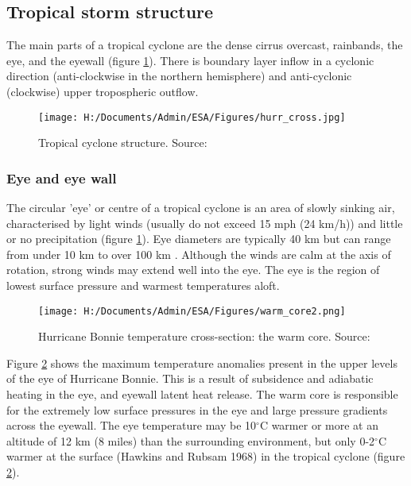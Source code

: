 

\subsection{Tropical storm structure}

The main parts of a tropical cyclone are the dense cirrus overcast, rainbands, the eye, and the eyewall (figure \ref{fig:cyclone_structure}). There is boundary layer inflow in a cyclonic direction (anti-clockwise in the northern hemisphere) and anti-cyclonic (clockwise) upper tropospheric outflow.


\begin{figure}[h]
	\centering
	\noindent\texttt{[image: H:/Documents/Admin/ESA/Figures/hurr\_cross.jpg]}
	\caption{Tropical cyclone structure. Source: \cite{noaa_structure}}\label{fig:cyclone_structure}
\end{figure}

\subsubsection{Eye and eye wall}
The circular 'eye' or centre of a tropical cyclone is an area of slowly sinking air, characterised by light winds (usually do not exceed 15 mph (24 km/h)) \citep{noaa_structure} and little or no precipitation (figure \ref{fig:cyclone_structure}). Eye diameters are typically 40 km but can range from under 10 km to over 100 km \citep{bom_tc}. Although the winds are calm at the axis of rotation, strong winds may extend well into the eye. The eye is the region of lowest surface pressure and warmest temperatures aloft.

\begin{figure}[h]
	\centering
	\noindent\texttt{[image: H:/Documents/Admin/ESA/Figures/warm\_core2.png]}
	\caption{Hurricane Bonnie temperature cross-section: the warm core. Source: \cite{eastin}}\label{fig:warm_core}
\end{figure}

Figure \ref{fig:warm_core} shows the maximum temperature anomalies present in the upper levels of the eye of Hurricane Bonnie. This is a result of subsidence and adiabatic heating in the eye, and eyewall latent heat release. The warm core is responsible for the extremely low surface pressures in the eye and large pressure gradients across the eyewall. The eye temperature may be 10$^{\circ}$C warmer or more at an altitude of 12 km (8 miles) than the surrounding environment, but only 0-2$^{\circ}$C warmer at the surface (Hawkins and Rubsam 1968) in the tropical cyclone (figure \ref{fig:warm_core}).

